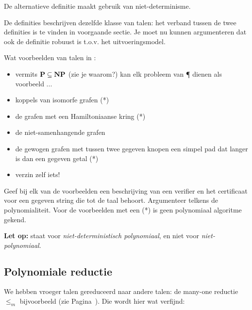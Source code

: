 De alternatieve definitie maakt gebruik van niet-determinisme.


De definities beschrijven dezelfde klasse van talen: het verband
tussen de twee definities is te vinden in voorgaande sectie. Je moet
nu kunnen argumenteren dat ook de definitie \NP robuust is t.o.v. het
uitvoeringsmodel.


Wat voorbeelden van talen in \NP:

\begin{itemize}
\item 
vermits ${\bf P} \subseteq {\bf NP}$ (zie je waarom?) kan elk probleem van \P
dienen als voorbeeld ...
\item 
koppels van isomorfe grafen (*)
\item 
de grafen met een Hamiltoniaanse kring (*)
\item
de niet-samenhangende grafen
\item
de gewogen grafen met tussen twee gegeven knopen een simpel pad dat
langer is dan een gegeven getal (*)
\item
verzin zelf iets!
\end{itemize}

Geef bij elk van de voorbeelden een beschrijving van een verifier en
het certificaat voor een gegeven string die tot de taal
behoort. Argumenteer telkens de polynomialiteit. Voor de voorbeelden
met een (*) is geen polynomiaal algoritme gekend.

{\bf Let op:} \NP staat voor {\em niet-deterministisch polynomiaal},
en niet voor {\em niet-polynomiaal}.

\subsection{Polynomiale reductie}

\begin{sloppypar}
We hebben vroeger talen gereduceerd naar andere talen: de many-one
reductie $\leq_m$ {\mbox bijvoorbeeld} (zie Pagina~\pageref{manyone}). Die
wordt hier wat verfijnd:
\end{sloppypar}



